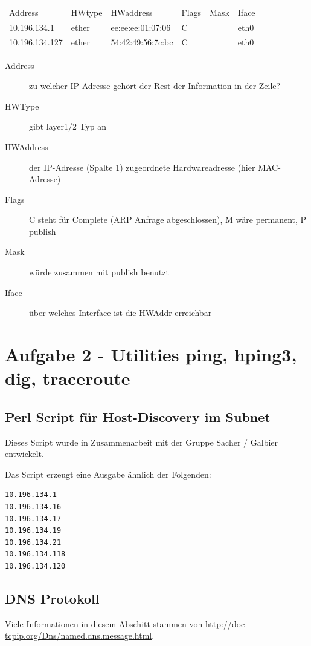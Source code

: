 \documentclass[a4paper,11pt]{scrartcl}
\begin{document}
\begin{tabular}{l|l|l|l|l|l}
	Address & HWtype & HWaddress & Flags & Mask & Iface \\
	10.196.134.1	&	ether	&	ee:ee:ee:01:07:06	&	C	&	&	eth0 \\
	10.196.134.127	&	ether   &	54:42:49:56:7c:bc	&	C	&	&	eth0
\end{tabular}
\begin{description}
	\item[Address] zu welcher IP-Adresse gehört der Rest der Information in der Zeile?
	\item[HWType] gibt layer1/2 Typ an
	\item[HWAddress] der IP-Adresse (Spalte 1) zugeordnete Hardwareadresse (hier MAC-Adresse)
	\item[Flags] C steht für Complete (ARP Anfrage abgeschlossen), M wäre permanent, P publish
	\item[Mask] würde zusammen mit publish benutzt
	\item[Iface] über welches Interface ist die HWAddr erreichbar
\end{description}


\FloatBarrier
\newpage
\section{Aufgabe 2 - Utilities ping, hping3, dig, traceroute}
\subsection{Perl Script für Host-Discovery im Subnet}
Dieses Script wurde in Zusammenarbeit mit der Gruppe Sacher / Galbier entwickelt.


Das Script erzeugt eine Ausgabe ähnlich der Folgenden:
\begin{lstlisting}
10.196.134.1
10.196.134.16
10.196.134.17
10.196.134.19
10.196.134.21
10.196.134.118
10.196.134.120
\end{lstlisting}

\FloatBarrier
\subsection{DNS Protokoll}
Viele Informationen in diesem Abschitt stammen von \url{http://doc-tcpip.org/Dns/named.dns.message.html}.
\end{document}
